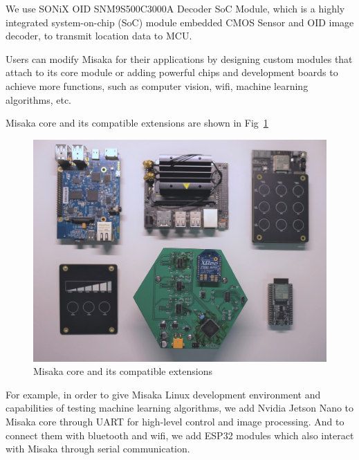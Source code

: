 \documentclass[conference]{IEEEtran}
\begin{document}
We use SONiX OID SNM9S500C3000A Decoder SoC Module, which is a highly integrated system-on-chip (SoC) module embedded CMOS Sensor and OID image decoder, to transmit location data to MCU.


Users can modify Misaka for their applications by designing custom modules that attach to its core module or adding powerful chips and development boards to achieve more functions, such as computer vision, wifi, machine learning algorithms, etc.

Misaka core and its compatible extensions are shown in Fig~\ref{fig:extension}

\begin{figure}[htbp]
    \centering
    \includegraphics[width=0.8\columnwidth]{extensions.jpg}
    \caption{Misaka core and its compatible extensions}
    \label{fig:extension}
\end{figure}

For example, in order to give Misaka Linux development environment and capabilities of testing machine learning algorithms, we add Nvidia Jetson Nano to Misaka core through UART for high-level control and image processing. And to connect them with bluetooth and wifi, we add ESP32 modules which also interact with Misaka through serial communication. 






\end{document}
